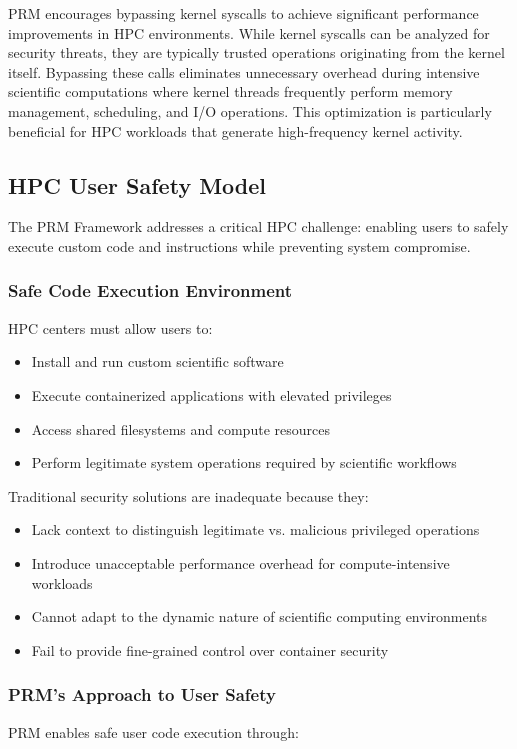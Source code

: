 \documentclass[conference]{IEEEtran}
\begin{document}
PRM encourages bypassing kernel syscalls to achieve significant performance improvements in HPC environments. While kernel syscalls can be analyzed for security threats, they are typically trusted operations originating from the kernel itself. Bypassing these calls eliminates unnecessary overhead during intensive scientific computations where kernel threads frequently perform memory management, scheduling, and I/O operations. This optimization is particularly beneficial for HPC workloads that generate high-frequency kernel activity.


\subsection{HPC User Safety Model}
The PRM Framework addresses a critical HPC challenge: enabling users to safely execute custom code and instructions while preventing system compromise.

\subsubsection{Safe Code Execution Environment}
HPC centers must allow users to:
\begin{itemize}
\item Install and run custom scientific software
\item Execute containerized applications with elevated privileges
\item Access shared filesystems and compute resources
\item Perform legitimate system operations required by scientific workflows
\end{itemize}

Traditional security solutions are inadequate because they:
\begin{itemize}
\item Lack context to distinguish legitimate vs. malicious privileged operations
\item Introduce unacceptable performance overhead for compute-intensive workloads
\item Cannot adapt to the dynamic nature of scientific computing environments
\item Fail to provide fine-grained control over container security
\end{itemize}

\subsubsection{PRM's Approach to User Safety}
PRM enables safe user code execution through:
\end{document}
